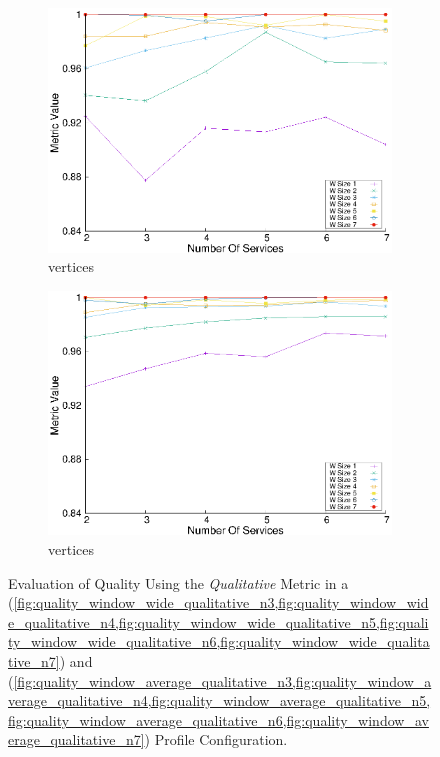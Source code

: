 \begin{figure}[H]
\begin{subfigure}{0.45\textwidth}
    \includegraphics[width=\textwidth]{Images/graphs/window_quality_performance_diff_qual_n7_s7_20_100_n7}
    \caption{ vertices}
    \label{fig:quality_window_wide_qualitative_n7}
  \end{subfigure}
  \hfill
  \begin{subfigure}{0.45\textwidth}
    \includegraphics[width=\textwidth]{Images/graphs/window_quality_performance_diff_qual_n7_s7_50_80_n7}
    \caption{ vertices}
    \label{fig:quality_window_average_qualitative_n7}
  \end{subfigure}

  \caption{Evaluation of Quality Using the \emph{Qualitative} Metric in a \wide (\cref{fig:quality_window_wide_qualitative_n3,fig:quality_window_wide_qualitative_n4,fig:quality_window_wide_qualitative_n5,fig:quality_window_wide_qualitative_n6,fig:quality_window_wide_qualitative_n7}) and \average (\cref{fig:quality_window_average_qualitative_n3,fig:quality_window_average_qualitative_n4,fig:quality_window_average_qualitative_n5,fig:quality_window_average_qualitative_n6,fig:quality_window_average_qualitative_n7}) Profile Configuration.}  \label{fig:quality_window_qualitative}

\end{figure}


